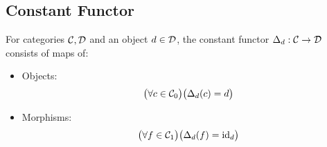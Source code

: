 \subsection{Constant Functor}
\begin{definition}
  For categories $\mathcal{C},\mathcal{D}$ and an object $d\in \mathcal{D}$, the constant functor
  $\Delta_d: \mathcal{C}\to \mathcal{D}$ consists of maps of: \parencite{awodey:category_theory}
  \begin{itemize}
    \item Objects:
      \[\big(\forall c\in \mathcal{C}_0\big)
        \big(\Delta_d(c) = d\big)\]
    \item Morphisms:
      \[\big(\forall f\in \mathcal{C}_1\big)
        \big(\Delta_d(f) = \mathrm{id}_d\big)\]
  \end{itemize}
\end{definition}
